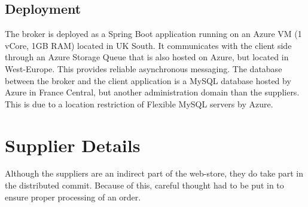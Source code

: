 \documentclass[10pt,a4paper,kul]{kulakarticle} %
\begin{document}
		\subsection{Deployment}
		The broker is deployed as a Spring Boot application running on an Azure VM (1 vCore, 1GB RAM) located in UK South. It communicates with the client side through an Azure Storage Queue that is also hosted on Azure, but located in West-Europe. This provides reliable asynchronous messaging. The database between the broker and the client application is a MySQL database hosted by Azure in France Central, but another administration domain than the suppliers. This is due to a location restriction of Flexible MySQL servers by Azure.
	
	\section{Supplier Details}
		Although the suppliers are an indirect part of the web-store, they do take part in the distributed commit. Because of this, careful thought had to be put in to ensure proper processing of an order. 
\end{document}
